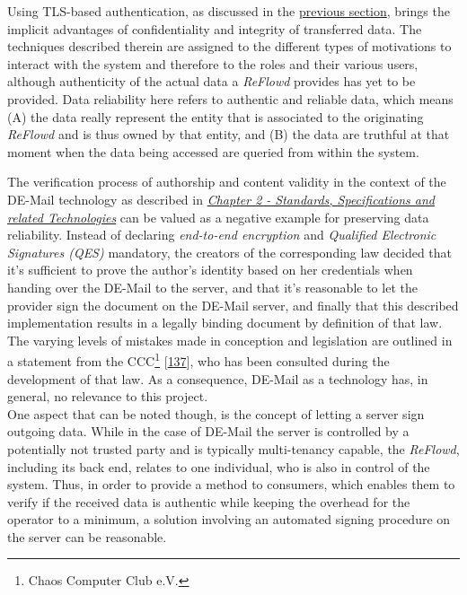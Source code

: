 \documentclass[12pt,english,a4paper,titlepage,cleardoublepage=empty,dottedtoc]{report}
\begin{document}
Using TLS-based authentication, as discussed in the
\protect\hyperlink{authentication}{previous section}, brings the
implicit advantages of confidentiality and integrity of transferred
data. The techniques described therein are assigned to the different
types of motivations to interact with the system and therefore to the
roles and their various users, although authenticity of the actual data
a \emph{ReFlowd} provides has yet to be provided. Data reliability here
refers to authentic and reliable data, which means (A) the data really
represent the entity that is associated to the originating
\emph{ReFlowd} and is thus owned by that entity, and (B) the data are
truthful at that moment when the data being accessed are queried from
within the system.

The verification process of authorship and content validity in the
context of the DE-Mail technology as described in
\emph{\protect\hyperlink{standards-specifications-and-related-technologies}{Chapter
2 - Standards, Specifications and related Technologies}} can be valued
as a negative example for preserving data reliability. Instead of
declaring \emph{end-to-end encryption} and \emph{Qualified Electronic
Signatures (QES)} mandatory, the creators of the corresponding law
decided that it's sufficient to prove the author's identity based on her
credentials when handing over the DE-Mail to the server, and that it's
reasonable to let the provider sign the document on the DE-Mail server,
and finally that this described implementation results in a legally
binding document by definition of that law. The varying levels of
mistakes made in conception and legislation are outlined in a statement
from the CCC\footnote{Chaos Computer Club e.V.}
{[}\protect\hyperlink{ref-statement_2013_de-mail}{137}{]}, who has been
consulted during the development of that law. As a consequence, DE-Mail
as a technology has, in general, no relevance to this project.\\
One aspect that can be noted though, is the concept of letting a server
sign outgoing data. While in the case of DE-Mail the server is
controlled by a potentially not trusted party and is typically
multi-tenancy capable, the \emph{ReFlowd}, including its back end,
relates to one individual, who is also in control of the system. Thus,
in order to provide a method to consumers, which enables them to verify
if the received data is authentic while keeping the overhead for the
operator to a minimum, a solution involving an automated signing
procedure on the server can be reasonable.
\end{document}
